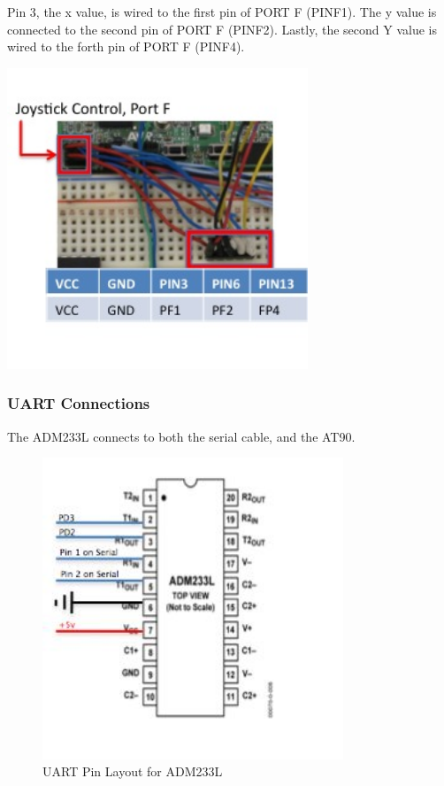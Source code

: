 Pin 3, the x value, is wired to the first pin of PORT F (PINF1). The y value is connected to the second pin of PORT F (PINF2). Lastly, the second Y value is wired to the forth pin of PORT F (PINF4).

  \begin{center}
    \includegraphics[width=90mm]{imageSources/joystickConnect.png}
  \end{center}
  \label{joystickConnect}


\subsubsection{UART Connections}
The ADM233L connects to both the serial cable, and the AT90. 
\begin{figure}[h]
  \begin{center}
    \includegraphics[width=90mm]{imageSources/uartConnect1.png}
  \end{center}
  \caption{UART Pin Layout for ADM233L} 
  \label{uartConnect1}
\end{figure}


